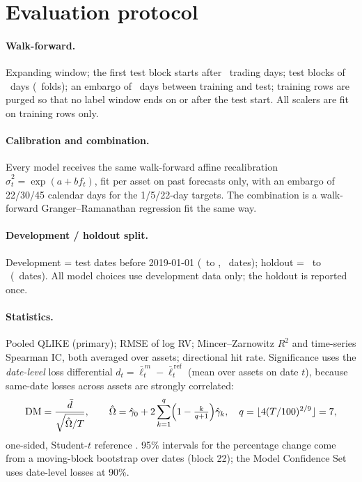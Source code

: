\documentclass[11pt,a4paper]{article}
\begin{document}
\section{Evaluation protocol}\label{sec:protocol}

\paragraph{Walk-forward.} Expanding window; the first test block starts after \MinTrainDays\ trading
days; test blocks of \TestDays\ days (\Folds\ folds); an embargo of \EmbargoDays\ days between training
and test; training rows are purged so that no label window ends on or after the test start. All scalers
are fit on training rows only.

\paragraph{Calibration and combination.} Every model receives the same walk-forward affine
recalibration $\hat\sigma^2_t = \exp(a + b f_t)$, fit per asset on past forecasts only, with an embargo
of 22/30/45 calendar days for the 1/5/22-day targets. The combination is a walk-forward
Granger--Ramanathan regression fit the same way.

\paragraph{Development / holdout split.} Development = test dates before 2019-01-01
(\DevStart\ to \DevEnd, \DevDates\ dates); holdout = \HoldStart\ to \HoldEnd\ (\HoldDates\ dates).
All model choices use development data only; the holdout is reported once.

\paragraph{Statistics.} Pooled QLIKE (primary); RMSE of log RV; Mincer--Zarnowitz $R^2$ and
time-series Spearman IC, both averaged over assets; directional hit rate. Significance uses the
\emph{date-level} loss differential $d_t = \bar\ell^{\,m}_t - \bar\ell^{\,\text{ref}}_t$ (mean over assets
on date $t$), because same-date losses across assets are strongly correlated:
\begin{equation}
\mathrm{DM} = \frac{\bar d}{\sqrt{\hat\Omega/T}},\qquad
\hat\Omega = \hat\gamma_0 + 2\sum_{k=1}^{q}\Bigl(1-\tfrac{k}{q+1}\Bigr)\hat\gamma_k,\quad
q=\lfloor 4(T/100)^{2/9}\rfloor = 7 ,
\end{equation}
one-sided, Student-$t$ reference \cite{dieboldmariano1995,neweywest1987}. 95\% intervals for the
percentage change come from a moving-block bootstrap over dates (block 22); the Model Confidence Set
\cite{hansen2011mcs} uses date-level losses at 90\%.
\end{document}
